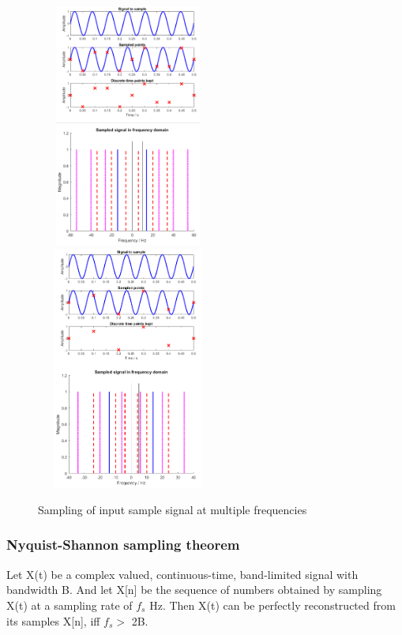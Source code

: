 \documentclass{article}
\begin{document}
\begin{figure}[!htb]
      \includegraphics[width=6cm, height=8cm, angle=0,rotate=0]{figures/Sample_Sinusoidal.PNG}
    \endminipage\hfill
      \includegraphics[width=6cm, height=8cm, angle=0,rotate=0]{figures/Sample_Sinusoidal_with_alias.PNG}
    \endminipage\hfill
    \caption{Sampling of input sample signal at multiple frequencies}
    \label{fig:Aliasing}
\end{figure}


\subsubsection{Nyquist-Shannon sampling theorem}
Let X(t) be a complex valued, continuous-time, band-limited signal with bandwidth B. And let X[n] be the sequence of numbers obtained by sampling X(t) at a sampling rate of $f_s$ Hz. Then X(t) can be perfectly reconstructed from its samples X[n], iff $ f_s > $ 2B. 
\end{document}

